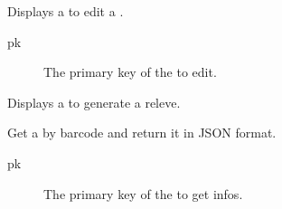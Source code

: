 \documentclass[letterpaper,10pt,english]{sphinxmanual}
\begin{document}
\begin{fulllineitems}
\label{\detokenize{modules/views:gestion.views.edit_menu}}
Displays a {\hyperref[\detokenize{modules/forms:gestion.forms.MenuForm}]{}} to edit a {\hyperref[\detokenize{modules/models:gestion.models.Menu}]{}}.
\begin{description}
\item[{pk}] \leavevmode
The primary key of the {\hyperref[\detokenize{modules/models:gestion.models.Menu}]{}} to edit.

\end{description}

\end{fulllineitems}


\begin{fulllineitems}
\label{\detokenize{modules/views:gestion.views.gen_releve}}
Displays a  to generate a releve.

\end{fulllineitems}


\begin{fulllineitems}
\label{\detokenize{modules/views:gestion.views.getProduct}}
Get a {\hyperref[\detokenize{modules/models:gestion.models.Product}]{}} by barcode and return it in JSON format.
\begin{description}
\item[{pk}] \leavevmode
The primary key of the {\hyperref[\detokenize{modules/models:gestion.models.Product}]{}} to get infos.

\end{description}

\end{fulllineitems}
\end{document}
